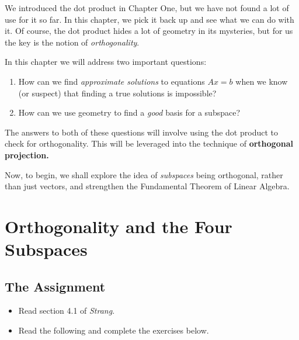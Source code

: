 \documentclass[10pt,]{book}
\newcommand{\terminology}[1]{\textbf{#1}}
\theoremstyle{plain}
\theoremstyle{definition}
\numberwithin{equation}{section}
\begin{document}
      We introduced the dot product in Chapter One, but we have not found a lot
      of use for it so far. In this chapter, we pick it back up and see what
      we can do with it. Of course, the dot product hides a lot of geometry
      in its mysteries, but for us the key is the notion of \emph{orthogonality}.
\par

      In this chapter we will address two important questions:
      \begin{enumerate}
\item{}
          How can we find \emph{approximate solutions} to equations \(Ax=b\)
          when we know (or suspect) that finding a true solutions is impossible?
        \item{}
          How can we use geometry to find a \emph{good} basis for a subspace?
        \end{enumerate}

      The answers to both of these questions will involve using the dot product
      to check for orthogonality. This will be leveraged into the technique of
      \terminology{orthogonal projection.}
\par

      Now, to begin, we shall explore the idea of \emph{subspaces} being orthogonal,
      rather than just vectors, and strengthen the Fundamental Theorem of Linear
      Algebra.
\typeout{************************************************}
\typeout{************************************************}
\section[Orthogonality and the Four Subspaces]{Orthogonality and the Four Subspaces}\label{section-ftla2}
\typeout{************************************************}
\typeout{************************************************}
\subsection[The Assignment]{The Assignment}\label{subsection-92}
\begin{itemize}
\item{}Read section 4.1 of \emph{Strang}.\item{}Read the following and complete the exercises below.\end{itemize}
\typeout{************************************************}
\typeout{************************************************}
\end{document}
